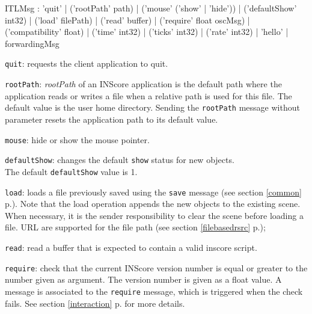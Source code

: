 \documentclass[a4paper,twoside]{report}
\newcommand{\fullref}[1]	{\ref{#1} p.\pageref{#1}}
\newcommand{\OSC}[1]		{\texttt{#1}}
\let\olditemize\itemize
\let\oldenditemize\enditemize
\renewenvironment{itemize} 	{\olditemize \setlength{\itemsep}{1mm}}{\oldenditemize}
\begin{document}
\begin{rail}
ITLMsg : 'quit' 
		| ('rootPath' path) 
		| ('mouse' ('show' | 'hide'))
		| ('defaultShow' int32)
		| ('load' filePath)
		| ('read' buffer)
		| ('require' float oscMsg)
		| ('compatibility' float)
		| ('time' int32)
		| ('ticks' int32)
		| ('rate' int32)
		| 'hello'
		| forwardingMsg
\end{rail}

\begin{itemize}
\item \OSC{quit}: requests the client application to quit.

\item \OSC{rootPath}: \emph{rootPath} of an INScore application is the default path where the application reads or writes a file when a relative path is used for this file. The default value is the user home directory. Sending the \OSC{rootPath} message without parameter resets the application path to its default value.

\item \OSC{mouse}: hide or show the mouse pointer.

\item \OSC{defaultShow}: changes the default \OSC{show} status for new objects. \\
The default \OSC{defaultShow} value is 1.

\item \OSC{load}: loads a file previously saved using the \OSC{save} message (see section \fullref{common}). Note that the load operation appends the new objects to the existing scene. When necessary, it is the sender responsibility to clear the scene before loading a file. URL are supported for the file path (see section \fullref{filebasedrsrc});

\item \OSC{read}: read a buffer that is expected to contain a valid inscore script.

\item \OSC{require}: check that the current INScore version number is equal or greater to the number given as argument. The version number is given as a float value. A message is associated to the \OSC{require} message, which is triggered when the check fails. See section \fullref{interaction} for more details.


\end{itemize}
\end{document}
